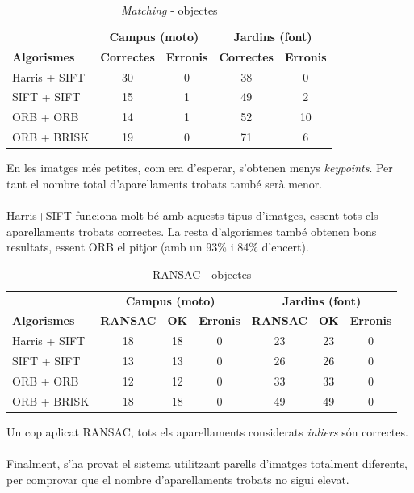 		\begin{table}[H]
			\begin{center}
				\begin{tabular}{l | c c | c c}
					& \multicolumn{2}{c|}{\textbf{Campus (moto)}} & \multicolumn{2}{c}{\textbf{Jardins (font)}} \\
					\textbf{Algorismes} & \textbf{Correctes} & \textbf{Erronis} & \textbf{Correctes} & \textbf{Erronis} \\ \hline
					Harris + SIFT & 30 & 0 & 38 & 0 \\
					SIFT + SIFT & 15 & 1 & 49 & 2 \\
					ORB + ORB & 14 & 1 & 52 & 10 \\
					ORB + BRISK & 19 & 0 & 71 & 6 \\
				\end{tabular}
			\end{center}
			\caption{\textit{Matching} - objectes}
		\end{table}
		\noindent
		En les imatges més petites, com era d'esperar, s'obtenen menys \textit{keypoints}. Per tant el nombre total d'aparellaments trobats també serà menor.\\\\
		Harris+SIFT funciona molt bé amb aquests tipus d'imatges, essent tots els aparellaments trobats correctes. La resta d'algorismes també obtenen bons resultats,
		essent ORB el pitjor (amb un 93\% i 84\% d'encert).\\
		\begin{table}[H]
			\begin{center}
				\begin{tabular}{l | c c c | c c c}
					& \multicolumn{3}{c|}{\textbf{Campus (moto)}} & \multicolumn{3}{c}{\textbf{Jardins (font)}} \\
					\textbf{Algorismes} & \textbf{RANSAC} & \textbf{OK} & \textbf{Erronis} & \textbf{RANSAC} & \textbf{OK} & \textbf{Erronis} \\ \hline
					Harris + SIFT & 18 & 18 & 0 & 23 & 23 & 0 \\
					SIFT + SIFT & 13 & 13 & 0 & 26 & 26 & 0 \\
					ORB + ORB & 12 & 12 & 0 & 33 & 33 & 0 \\
					ORB + BRISK & 18 & 18 & 0 & 49 & 49 & 0 \\
				\end{tabular}
			\end{center}
			\caption{RANSAC - objectes}
		\end{table}
		\noindent
		Un cop aplicat RANSAC, tots els aparellaments considerats \textit{inliers} són correctes.\\\\
		Finalment, s'ha provat el sistema utilitzant parells d'imatges totalment diferents, per comprovar que el nombre d'aparellaments trobats no sigui elevat.\\

